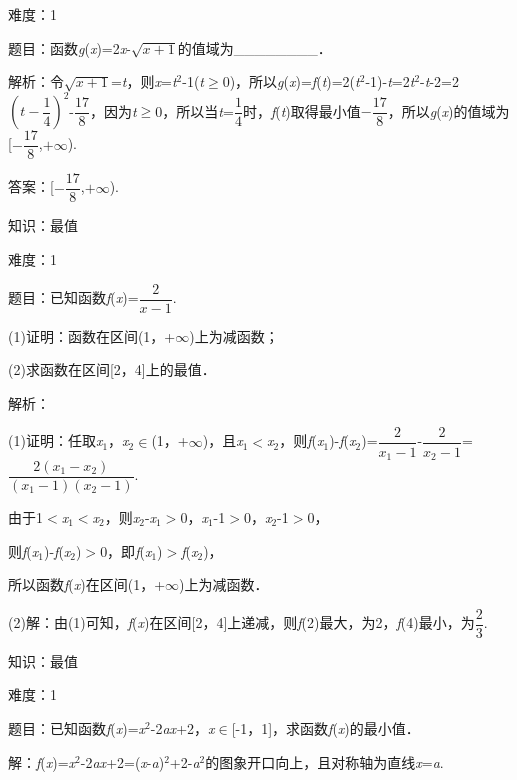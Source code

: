 \documentclass{article} %
\begin{document}
难度：1

题目：函数\textit{g}(\textit{x})=2\textit{x}-$\sqrt{x+1}$的值域为\_\_\_\_\_\_\_\_．

解析：令$\sqrt{x+1}$=\textit{t}，则\textit{x}=\textit{t}${}^{2}$-1(\textit{t}$\mathrm{\ge}$0)，所以\textit{g}(\textit{x})=\textit{f}(\textit{t})=2(\textit{t}${}^{2}$-1)-\textit{t}=2\textit{t}${}^{2}$-\textit{t}-2=2$(t-\dfrac{1}{4})^{2}$-$\dfrac{17}{8}$，因为\textit{t}$\mathrm{\ge}$0，所以当\textit{t}=$\dfrac{1}{4}$时，\textit{f}(\textit{t})取得最小值$-\dfrac{17}{8}$，所以\textit{g}(\textit{x})的值域为[$-\dfrac{17}{8}$,$+\infty$).

答案：[$-\dfrac{17}{8}$,$+\infty$).

知识：最值

难度：1

题目：已知函数\textit{f}(\textit{x})=$\dfrac{2}{x-1}$.

(1)证明：函数在区间(1，+$\mathrm{\infty}$)上为减函数；

(2)求函数在区间[2，4]上的最值．

解析：

(1)证明：任取\textit{x}${}_{1}$，\textit{x}${}_{2}$$\mathrm{\in}$(1，+$\mathrm{\infty}$)，且\textit{x}${}_{1}$$\mathrm{<}$\textit{x}${}_{2}$，则\textit{f}(\textit{x}${}_{1}$)-\textit{f}(\textit{x}${}_{2}$)=$\dfrac{2}{x_{1}-1}$-$\dfrac{2}{x_{2}-1}$=$\dfrac{2(x_{1}-x_{2})}{(x_{1}-1)(x_{2}-1)}$.

由于1$\mathrm{<}$\textit{x}${}_{1}$$\mathrm{<}$\textit{x}${}_{2}$，则\textit{x}${}_{2}$-\textit{x}${}_{1}$$\mathrm{>}$0，\textit{x}${}_{1}$-1$\mathrm{>}$0，\textit{x}${}_{2}$-1$\mathrm{>}$0，

则\textit{f}(\textit{x}${}_{1}$)-\textit{f}(\textit{x}${}_{2}$)$\mathrm{>}$0，即\textit{f}(\textit{x}${}_{1}$)$\mathrm{>}$\textit{f}(\textit{x}${}_{2}$)，

所以函数\textit{f}(\textit{x})在区间(1，+$\mathrm{\infty}$)上为减函数．

(2)解：由(1)可知，\textit{f}(\textit{x})在区间[2，4]上递减，则\textit{f}(2)最大，为2，\textit{f}(4)最小，为$\dfrac{2}{3}$.

知识：最值

难度：1

题目：已知函数\textit{f}(\textit{x})=\textit{x}${}^{2}$-2\textit{ax}+2，\textit{x}$\mathrm{\in}$[-1，1]，求函数\textit{f}(\textit{x})的最小值．

解：\textit{f}(\textit{x})=\textit{x}${}^{2}$-2\textit{ax}+2=(\textit{x}-\textit{a})${}^{2}$+2-\textit{a}${}^{2}$的图象开口向上，且对称轴为直线\textit{x}=\textit{a}.
\end{document}

